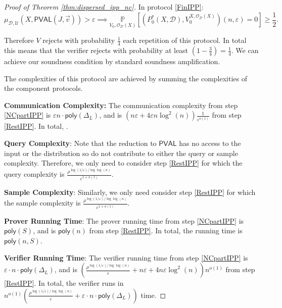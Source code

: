 \documentclass[11pt]{article}
\newcommand{\poly}{\mathsf{poly}}
\newcommand{\PVAL}{\mathsf{PVAL}}
\newcommand{\sD}{\mathcal{D}}
\begin{document}
\begin{proof}[Proof of Theorem \ref{thm:dispersed_ipp_nc}]
In protocol \ref{FinIPP}:
\begin{equation*}
    \mu_{\sD,\mathcal{U}}(X,\PVAL(J,\vec{v}))>\varepsilon\implies \underset{V_{0},\mathcal{O}_{\mathcal{D}}(X)}{\mathbb{P}}\left[(P^{\ast}_{0}(X,\sD),V_{0}^{X,\mathcal{O}_{\sD}(X)})(n,\varepsilon)=0\right]\geq \frac{1}{2}.
\end{equation*}

Therefore $V$ rejects with probability $\frac{1}{4}$ each repetition of this protocol. In total this means that the verifier rejects with probability at least $\left(1-\frac{3}{4}\right)=\frac{1}{4}$. We can achieve our soundness condition by standard soundness amplification. 

The complexities of this protocol are achieved by summing the complexities of the component protocols. 

\vspace{0.1in}
\textbf{Communication Complexity:} The communication complexity from step \ref{NCpartIPP} is $\varepsilon n \cdot \poly(\Delta_{L})$, and is $(n\varepsilon+4\varepsilon n\log^{2} (n))\frac{1}{\varepsilon^{o(1)}}$ from step \ref{RestIPP}. In total, \sloppy{$c(n) =  (\varepsilon\cdot n+4\varepsilon n \log^{2}(n)) \frac{1}{\varepsilon}^{o(1)}+\varepsilon\cdot n\cdot \poly(\Delta_{L}) $}.

\vspace{0.1in}
\textbf{Query Complexity}: Note that the reduction to $\PVAL$ has no access to the input or the distribution so do not contribute to either the query or sample complexity. Therefore, we only need to consider step \ref{RestIPP} for which the query complexity is $\frac{\rho^{\log (1/\varepsilon)/\log\log (n)}}{\varepsilon^{1+o(1)}}$.

\vspace{0.1in}
\textbf{Sample Complexity}: Similarly, we only need consider step \ref{RestIPP} for which the sample complexity is $\frac{\rho^{\log (1/\varepsilon)/\log\log (n)}}{\varepsilon^{1+o(1)}}$.

\vspace{0.1in}
\textbf{Prover Running Time}: The prover running time from step \ref{NCpartIPP} is $\poly(S)$, and is $\poly(n)$ from step \ref{RestIPP}. In total,  the running time is $\poly(n,S)$.

\vspace{0.1in}
\textbf{Verifier Running Time}: The verifier running time from step \ref{NCpartIPP} is $\varepsilon\cdot n\cdot\poly(\Delta_{L})$, and is $\left( \frac{\rho^{\log (1/\varepsilon)/\log\log (n)}}{\varepsilon}+n\varepsilon + 4n\varepsilon \log^{2} (n) \right) n^{o(1)}$ from step \ref{RestIPP}. In total, the verifier runs in $n^{o(1)} \left( \frac{\rho^{\log (1/\varepsilon)/\log\log (n)}}{\varepsilon}+\varepsilon\cdot n\cdot\poly(\Delta_{L}) \right)$ time.


\end{proof}
\end{document}
